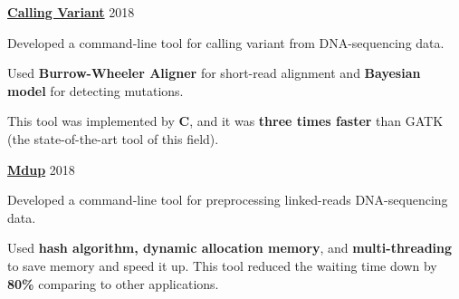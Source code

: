 

\begin{cventries}

  \cvsimpleentry
    {\href{https://github.com/tuan-tt/calling_variant}{\textbf{Calling Variant}}} %
    {2018} %
    {
      \begin{cvitems} %
        \item {Developed a command-line tool for calling variant from DNA-sequencing data.}
        \item {Used \textbf{Burrow-Wheeler Aligner} for short-read alignment and \textbf{Bayesian model} for detecting mutations.}
        \item {This tool was implemented by \textbf{C}, and it was \textbf{three times faster} than GATK (the state-of-the-art tool of this field).}
      \end{cvitems}
    }

  \cvsimpleentry
    {\href{https://github.com/kspham/mdup}{\textbf{Mdup}}} %
    {2018} %
    {
      \begin{cvitems} %
        \item {Developed a command-line tool for preprocessing linked-reads DNA-sequencing data.}
        \item {Used \textbf{hash algorithm, dynamic allocation memory}, and \textbf{multi-threading} to save memory and speed it up. This tool reduced the waiting time down by \textbf{80\%} comparing to other applications.}
      \end{cvitems}
    }

\end{cventries}
